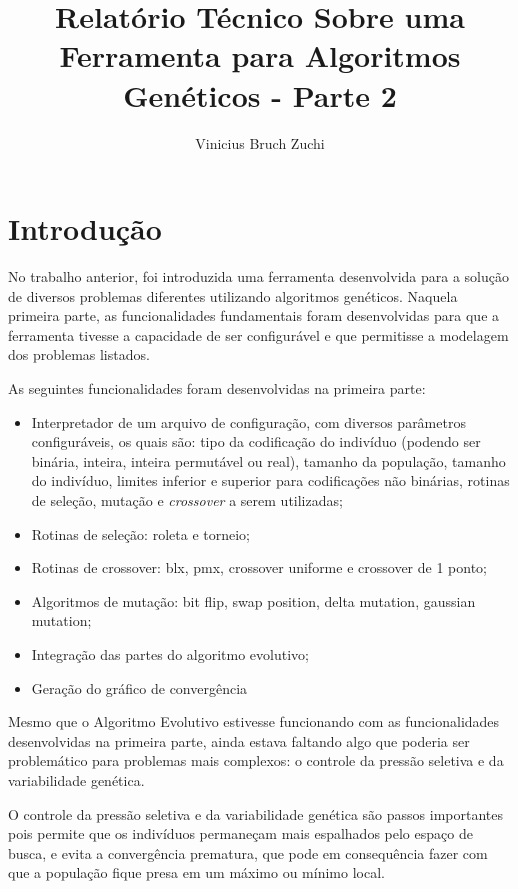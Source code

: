 \documentclass[12pt]{article}
\title{Relatório Técnico Sobre uma Ferramenta para Algoritmos Genéticos - Parte 2}
\author{Vinicius Bruch Zuchi\inst{1} }
\begin{document}
 
\maketitle

\section{Introdução}

No trabalho anterior, foi introduzida uma ferramenta desenvolvida para a solução de 
diversos problemas diferentes utilizando algoritmos genéticos. Naquela primeira parte, 
as funcionalidades fundamentais foram desenvolvidas para que a ferramenta tivesse a 
capacidade de ser configurável e que permitisse a modelagem dos problemas listados. 

As seguintes funcionalidades foram desenvolvidas na primeira parte:
\begin{itemize}
    \item Interpretador de um arquivo de configuração, com diversos parâmetros 
        configuráveis, os quais são: tipo da codificação do indivíduo (podendo ser 
        binária, inteira, inteira permutável ou real), tamanho da população, tamanho do 
        indivíduo, limites inferior e superior para codificações não binárias, rotinas de 
        seleção, mutação e \textit{crossover} a serem utilizadas;
    \item Rotinas de seleção: roleta e torneio;
    \item Rotinas de crossover: blx, pmx, crossover uniforme e crossover de 1 ponto;
    \item Algoritmos de mutação: bit flip, swap position, delta mutation, gaussian mutation;
    \item Integração das partes do algoritmo evolutivo;
    \item Geração do gráfico de convergência
\end{itemize}

\vspace{1cm}

Mesmo que o Algoritmo Evolutivo estivesse funcionando com as funcionalidades desenvolvidas 
na primeira parte, ainda estava faltando algo que poderia ser problemático para problemas 
mais complexos: o controle da pressão seletiva e da variabilidade genética. 

O controle da pressão seletiva e da variabilidade genética são passos importantes pois 
permite que os indivíduos permaneçam mais espalhados pelo espaço de busca, e evita a 
convergência prematura, que pode em consequência fazer com que a população fique presa 
em um máximo ou mínimo local.
\end{document}
